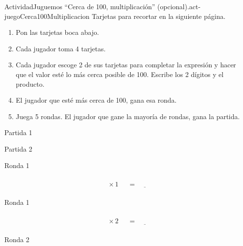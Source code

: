 \documentclass[14pt]{extarticle}
\begin{document}
\begin{activity}{Actividad}{Juguemos “Cerca de 100, multiplicación” (opcional).}{act-juegoCerca100Multiplicacion}%
Tarjetas para recortar en la siguiente página.%
%
\begin{enumerate}
\item{}Pon las tarjetas boca abajo.%
\item{}Cada jugador toma 4 tarjetas.%
\item{}Cada jugador escoge 2 de sus tarjetas para completar la expresión y hacer que el valor esté lo más cerca posible de 100. Escribe los 2 dígitos y el producto.%
\item{}El jugador que esté más cerca de 100, gana esa ronda.%
\item{}Juega 5 rondas. El jugador que gane la mayoría de rondas, gana la partida.%
\end{enumerate}
\begin{sidebyside}{2}{0}{0}{0.1}%
\begin{sbspanel}{0.45}%
\alert{Partida 1}%
\end{sbspanel}%
\begin{sbspanel}{0.45}%
\par
\alert{Partida 2}%
\end{sbspanel}%
\end{sidebyside}%
\begin{sidebyside}{2}{0}{0}{0.1}%
\begin{sbspanel}{0.45}%
Ronda 1%
\par
%
\begin{equation*}
\boxed{\phantom{\frac{00}{00}}} \times 1 \ \boxed{\phantom{\frac{00}{00}}}= \underline{\hspace{1cm}}
\end{equation*}
%
\end{sbspanel}%
\begin{sbspanel}{0.45}%
Ronda 1%
\par
%
\begin{equation*}
\boxed{\phantom{\frac{00}{00}}} \times 2 \ \boxed{\phantom{\frac{00}{00}}}= \underline{\hspace{1cm}}
\end{equation*}
%
\end{sbspanel}%
\end{sidebyside}%
\begin{sidebyside}{2}{0}{0}{0.1}%
\begin{sbspanel}{0.45}%
Ronda 2%
\par
%
\begin{equation*}

\end{equation*}
\end{sbspanel}
\end{sidebyside}
\end{activity}
\end{document}
